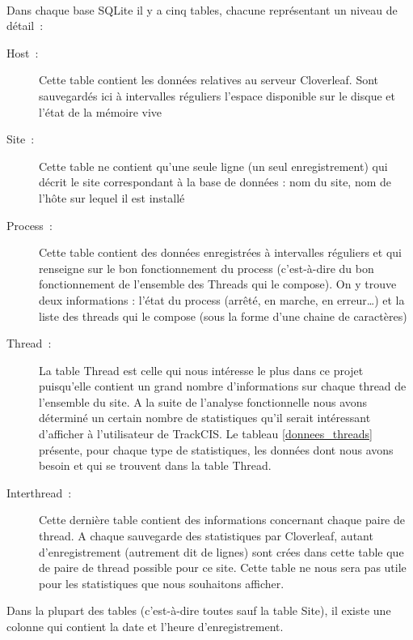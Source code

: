 			\paragraph{}
			Dans chaque base SQLite il y a cinq tables, chacune représentant
			un niveau de détail~:
			\begin{description}
			  \item[Host~:] Cette table contient les données relatives au serveur
			  Cloverleaf. Sont sauvegardés ici à intervalles réguliers l'espace
			  disponible sur le disque et l'état de la mémoire vive
			  \item[Site~:] Cette table ne contient qu'une seule ligne (un seul
			  enregistrement) qui décrit le site correspondant à la base de données : nom
			  du site, nom de l'hôte sur lequel il est installé
			  \item[Process~:] Cette table contient des données enregistrées à
			  intervalles réguliers et qui renseigne sur le bon fonctionnement du process
			  (c'est-à-dire du bon fonctionnement de l'ensemble des Threads qui le
			  compose). On y trouve deux informations : l'état du process (arrêté, en
			  marche, en erreur\ldots) et la liste des threads qui le compose (sous la
			  forme d'une chaine de caractères)
			  \item[Thread~:] La table Thread est celle qui nous intéresse le plus dans
			  ce projet puisqu'elle contient un grand nombre d'informations sur chaque
			  thread de l'ensemble du site. A la suite de l'analyse fonctionnelle nous
			  avons déterminé un certain nombre de statistiques qu'il serait intéressant
			  d'afficher à l'utilisateur de TrackCIS. Le tableau \ref{donnees_threads}
			  présente, pour chaque type de statistiques, les données dont nous avons
			  besoin et qui se trouvent dans la table Thread.
			  \item[Interthread~:] Cette dernière table contient des informations
			  concernant chaque paire de thread. A chaque sauvegarde des statistiques par
			  Cloverleaf, autant d'enregistrement (autrement dit de lignes) sont crées
			  dans cette table que de paire de thread possible pour ce site. Cette table
			  ne nous sera pas utile pour les statistiques que nous souhaitons afficher.
			\end{description}
			Dans la plupart des tables (c'est-à-dire toutes sauf la table Site), il
			existe une colonne qui contient la date et l'heure d'enregistrement.
